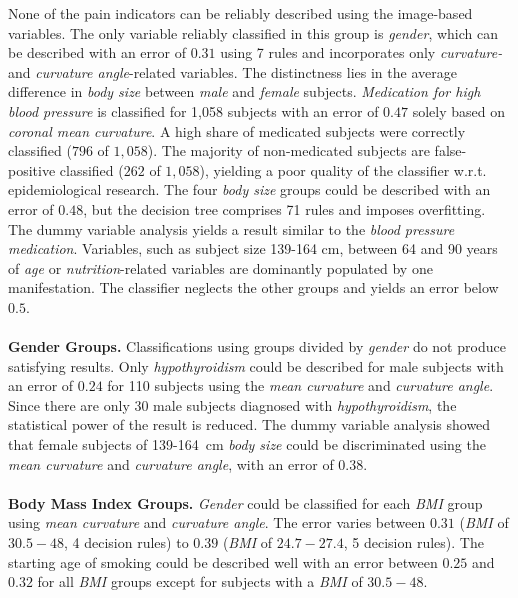 \documentclass[a4paper,twoside]{style/article}
\begin{document}
None of the pain indicators can be reliably described using the image-based variables.
The only variable reliably classified in this group is \emph{gender}, which can be described with an error of $0.31$ using 7 rules and incorporates only \emph{curvature-} and \emph{curvature angle}-related variables.
%
The distinctness lies in the average difference in \emph{body size} between \emph{male} and \emph{female} subjects.
\emph{Medication for high blood pressure} is classified for 1,058 subjects with an error of $0.47$ solely based on \emph{coronal mean curvature}.
A high share of medicated subjects were correctly classified ($796$ of $1,058$).
The majority of non-medicated subjects are false-positive classified ($262$ of $1,058$), yielding a poor quality of the classifier w.r.t. epidemiological research.
The four \emph{body size} groups could be described with an error of $0.48$, but the decision tree comprises 71 rules and imposes overfitting.
The dummy variable analysis yields a result similar to the \emph{blood pressure medication}.
Variables, such as subject size 139-164 cm, between 64 and 90 years of \emph{age} or \emph{nutrition}-related variables are dominantly populated by one manifestation.
The classifier neglects the other groups and yields an error below $0.5$.
\\\\
\noindent \textbf{Gender Groups.}
Classifications using groups divided by \emph{gender} do not produce satisfying results.
Only \emph{hypothyroidism} could be described for male subjects with an error of $0.24$ for 110 subjects using the \emph{mean curvature} and \emph{curvature angle}.
Since there are only 30 male subjects diagnosed with \emph{hypothyroidism}, the statistical power of the result is reduced.
The dummy variable analysis showed that female subjects of 139-164~cm \emph{body size} could be discriminated using the \emph{mean curvature} and \emph{curvature angle}, with an error of $0.38$.
\\\\
\noindent \textbf{Body Mass Index Groups.}
\emph{Gender} could be classified for each \emph{BMI} group using \emph{mean curvature} and \emph{curvature angle}.
The error varies between $0.31$ (\emph{BMI} of \emph{$30.5-48$}, 4 decision rules) to $0.39$ (\emph{BMI} of \emph{$24.7-27.4$}, 5 decision rules).
The starting age of smoking could be described well with an error between $0.25$ and $0.32$ for all \emph{BMI} groups except for subjects with a \emph{BMI} of \emph{$30.5-48$}.
\end{document}
